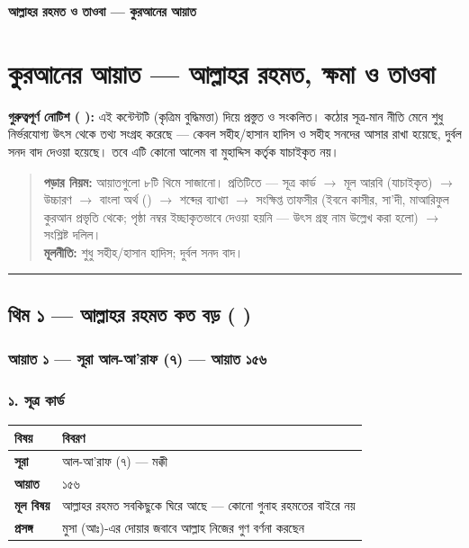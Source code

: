 

\begin{center}{\Large\bfseries\color{emerald} আল্লাহর রহমত ও তাওবা — কুরআনের আয়াত}\end{center}
\vspace{1em}
\section*{কুরআনের আয়াত — আল্লাহর রহমত, ক্ষমা ও তাওবা}

\begin{warnbox}
 \textbf{গুরুত্বপূর্ণ নোটিশ ( ):} এই কন্টেন্টটি  (কৃত্রিম বুদ্ধিমত্তা) দিয়ে প্রস্তুত ও সংকলিত।  কঠোর সূত্র-মান নীতি মেনে শুধু নির্ভরযোগ্য উৎস থেকে তথ্য সংগ্রহ করেছে — কেবল সহীহ/হাসান হাদিস ও সহীহ সনদের আসার রাখা হয়েছে, দুর্বল সনদ বাদ দেওয়া হয়েছে। তবে এটি কোনো আলেম বা মুহাদ্দিস কর্তৃক যাচাইকৃত নয়।
\end{warnbox}

\begin{quote}
\textbf{পড়ার নিয়ম:} আয়াতগুলো ৮টি থিমে সাজানো। প্রতিটিতে — সূত্র কার্ড $\rightarrow$ মূল আরবি (যাচাইকৃত) $\rightarrow$ উচ্চারণ $\rightarrow$ বাংলা অর্থ () $\rightarrow$ শব্দের ব্যাখ্যা $\rightarrow$ সংক্ষিপ্ত তাফসীর (ইবনে কাসীর, সা'দী, মাআরিফুল কুরআন প্রভৃতি থেকে; পৃষ্ঠা নম্বর ইচ্ছাকৃতভাবে দেওয়া হয়নি — উৎস গ্রন্থ নাম উল্লেখ করা হলো) $\rightarrow$ সংশ্লিষ্ট দলিল। \\
\textbf{মূলনীতি:} শুধু সহীহ/হাসান হাদিস; দুর্বল সনদ বাদ।
\end{quote}

\medskip\hrule\medskip

\subsection*{থিম ১ — আল্লাহর রহমত কত বড় (   )}

\subsubsection*{আয়াত ১ — সূরা আল-আ'রাফ (৭) — আয়াত ১৫৬}

\subsubsection*{১. সূত্র কার্ড}

\begin{table}[h]\centering\small
\begin{tabular}{ll}
বিষয় & বিবরণ \\
\hline
\textbf{সূরা} & আল-আ'রাফ (৭) — মক্কী \\
\textbf{আয়াত} & ১৫৬ \\
\textbf{মূল বিষয়} & আল্লাহর রহমত সবকিছুকে ঘিরে আছে — কোনো গুনাহ রহমতের বাইরে নয় \\
\textbf{প্রসঙ্গ} & মুসা (আঃ)-এর দোয়ার জবাবে আল্লাহ নিজের গুণ বর্ণনা করছেন \\
\hline
\end{tabular}
\end{table}

